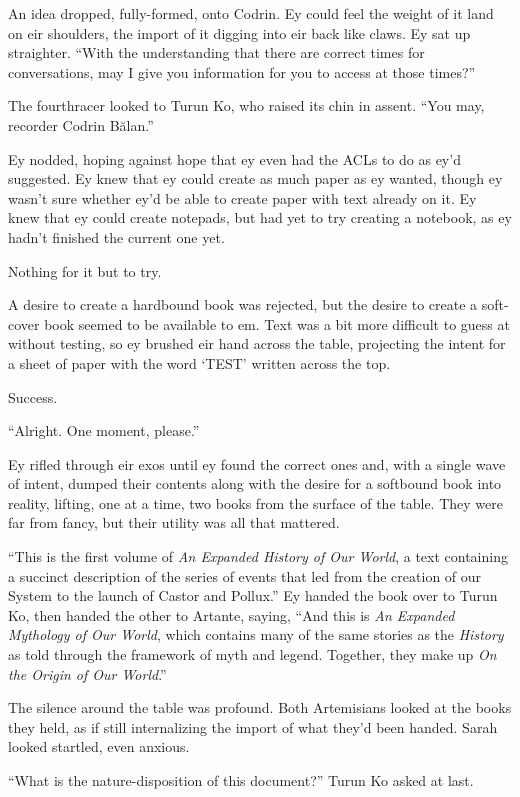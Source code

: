 An idea dropped, fully-formed, onto Codrin. Ey could feel the weight of it land on eir shoulders, the import of it digging into eir back like claws. Ey sat up straighter. ``With the understanding that there are correct times for conversations, may I give you information for you to access at those times?''

The fourthracer looked to Turun Ko, who raised its chin in assent. ``You may, recorder Codrin Bălan.''

Ey nodded, hoping against hope that ey even had the ACLs to do as ey'd suggested. Ey knew that ey could create as much paper as ey wanted, though ey wasn't sure whether ey'd be able to create paper with text already on it. Ey knew that ey could create notepads, but had yet to try creating a notebook, as ey hadn't finished the current one yet.

Nothing for it but to try.

A desire to create a hardbound book was rejected, but the desire to create a soft-cover book seemed to be available to em. Text was a bit more difficult to guess at without testing, so ey brushed eir hand across the table, projecting the intent for a sheet of paper with the word `TEST' written across the top.

Success.

``Alright. One moment, please.''

Ey rifled through eir exos until ey found the correct ones and, with a single wave of intent, dumped their contents along with the desire for a softbound book into reality, lifting, one at a time, two books from the surface of the table. They were far from fancy, but their utility was all that mattered.

``This is the first volume of \emph{An Expanded History of Our World}, a text containing a succinct description of the series of events that led from the creation of our System to the launch of Castor and Pollux.'' Ey handed the book over to Turun Ko, then handed the other to Artante, saying, ``And this is \emph{An Expanded Mythology of Our World}, which contains many of the same stories as the \emph{History} as told through the framework of myth and legend. Together, they make up \emph{On the Origin of Our World}.''

The silence around the table was profound. Both Artemisians looked at the books they held, as if still internalizing the import of what they'd been handed. Sarah looked startled, even anxious.

``What is the nature-disposition of this document?'' Turun Ko asked at last.

